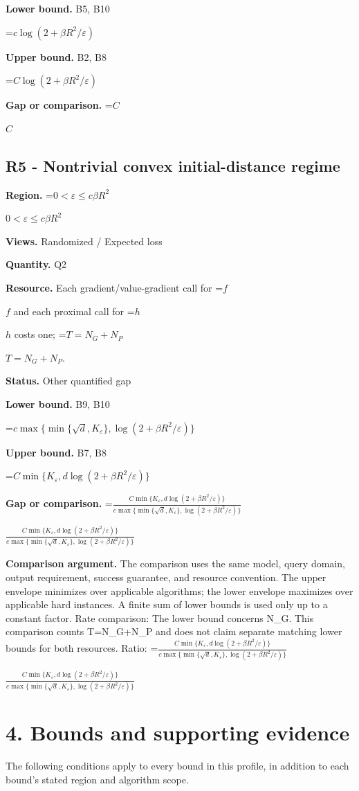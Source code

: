 \documentclass[10pt,a4paper]{article}
\newcommand{\AtlasMath}[1]{\par\begingroup\centering\setbox0=\hbox{$\displaystyle #1$}\ifdim\wd0>1.4\linewidth\typeout{ATLAS WIDE FORMULA: \the\wd0}\fi\ifdim\wd0>\linewidth\resizebox{\linewidth}{!}{\box0}\else\box0\fi\par\endgroup}
\newcommand{\AtlasInlineMath}[1]{\begingroup\setbox0=\hbox{$#1$}\ifdim\wd0>.4\linewidth\endgroup\AtlasMath{#1}\else\endgroup$#1$\fi}
\begin{document}
\textbf{Lower bound.} B5, B10

\AtlasMath{c\log(2+\beta R^2/\varepsilon)}
\textbf{Upper bound.} B2, B8

\AtlasMath{C\log(2+\beta R^2/\varepsilon)}
\textbf{Gap or comparison.} \AtlasInlineMath{C}

\subsection{R5 - Nontrivial convex initial-distance regime}
\textbf{Region.} \AtlasInlineMath{0<\varepsilon\le c\beta R^2}

\textbf{Views.} Randomized / Expected loss

\textbf{Quantity.} Q2

\textbf{Resource.} Each gradient/value-gradient call for \AtlasInlineMath{f} and each proximal call for \AtlasInlineMath{h} costs one; \AtlasInlineMath{T=N_G+N_P}.

\textbf{Status.} Other quantified gap

\textbf{Lower bound.} B9, B10

\AtlasMath{c\max\{\min\{\sqrt d,K_\varepsilon\},\log(2+\beta R^2/\varepsilon)\}}
\textbf{Upper bound.} B7, B8

\AtlasMath{C\min\{K_\varepsilon,d\log(2+\beta R^2/\varepsilon)\}}
\textbf{Gap or comparison.} \AtlasInlineMath{\frac{C\min\{K_\varepsilon,d\log(2+\beta R^2/\varepsilon)\}}{c\max\{\min\{\sqrt d,K_\varepsilon\},\log(2+\beta R^2/\varepsilon)\}}}

\textbf{Comparison argument.} The comparison uses the same model, query domain, output requirement, success guarantee, and resource convention. The upper envelope minimizes over applicable algorithms; the lower envelope maximizes over applicable hard instances. A finite sum of lower bounds is used only up to a constant factor. Rate comparison: The lower bound concerns N\_G. This comparison counts T=N\_G+N\_P and does not claim separate matching lower bounds for both resources. Ratio: \AtlasInlineMath{\frac{C\min\{K_\varepsilon,d\log(2+\beta R^2/\varepsilon)\}}{c\max\{\min\{\sqrt d,K_\varepsilon\},\log(2+\beta R^2/\varepsilon)\}}}

\section{4. Bounds and supporting evidence}
The following conditions apply to every bound in this profile, in addition to each bound's stated region and algorithm scope.
\end{document}
